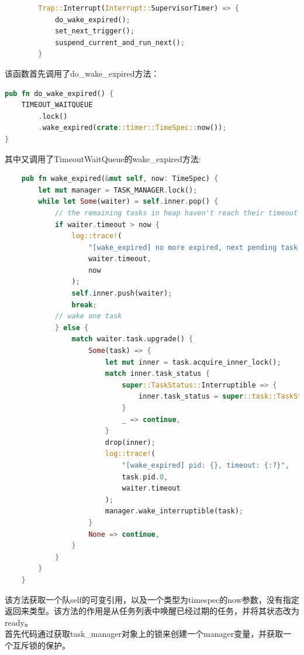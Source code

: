 \begin{lstlisting}[language=rust,caption={trap_handler中对SupervisorTimer中断的处理}]
            Trap::Interrupt(Interrupt::SupervisorTimer) => {
            do_wake_expired();
            set_next_trigger();
            suspend_current_and_run_next();
        }
\end{lstlisting}
该函数首先调用了do_wake_expired方法：
\begin{lstlisting}[language=rust,caption={do_wake_expired方法}]
    pub fn do_wake_expired() {
    TIMEOUT_WAITQUEUE
        .lock()
        .wake_expired(crate::timer::TimeSpec::now());
}
\end{lstlisting}
其中又调用了TimeoutWaitQueue的wake_expired方法:
\begin{lstlisting}[language=rust,caption={wake_expired方法}]
        pub fn wake_expired(&mut self, now: TimeSpec) {
        let mut manager = TASK_MANAGER.lock();
        while let Some(waiter) = self.inner.pop() {
            // the remaining tasks in heap haven't reach their timeout
            if waiter.timeout > now {
                log::trace!(
                    "[wake_expired] no more expired, next pending task timeout: {:?}, now: {:?}",
                    waiter.timeout,
                    now
                );
                self.inner.push(waiter);
                break;
            // wake one task
            } else {
                match waiter.task.upgrade() {
                    Some(task) => {
                        let mut inner = task.acquire_inner_lock();
                        match inner.task_status {
                            super::TaskStatus::Interruptible => {
                                inner.task_status = super::task::TaskStatus::Ready
                            }
                            _ => continue,
                        }
                        drop(inner);
                        log::trace!(
                            "[wake_expired] pid: {}, timeout: {:?}",
                            task.pid.0,
                            waiter.timeout
                        );
                        manager.wake_interruptible(task);
                    }
                    None => continue,
                }
            }
        }
    }
\end{lstlisting}
该方法获取一个队self的可变引用，以及一个类型为timespec的now参数，没有指定返回来类型。该方法的作用是从任务列表中唤醒已经过期的任务，并将其状态改为ready。
\\[10pt]
首先代码通过获取task_manager对象上的锁来创建一个manager变量，并获取一个互斥锁的保护。\\
